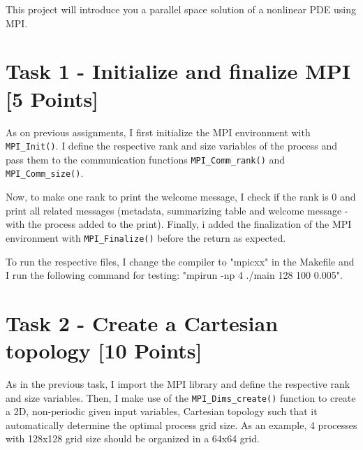 \documentclass[unicode,11pt,a4paper,oneside,numbers=endperiod,openany]{scrartcl}
\begin{document}
\setassignment

\newline

\assignmentpolicy
This project will introduce you a parallel space solution of a nonlinear PDE using MPI.


\section{Task 1 - Initialize and finalize MPI [5 Points]}

As on previous assignments, I first initialize the MPI environment with \texttt{MPI\_Init()}.
I define the respective rank and size variables of the process and pass them to
the communication functions \texttt{MPI\_Comm\_rank()} and \texttt{MPI\_Comm\_size()}.

Now, to make one rank to print the welcome message, I check if the rank is 0 and print all related messages
(metadata, summarizing table and welcome message - with the process added to the print). Finally, i added
the finalization of the MPI environment with \texttt{MPI\_Finalize()} before the return as expected.

To run the respective files, I change the compiler to "mpicxx" in the Makefile and I run the 
following command for testing: "mpirun -np 4 ./main 128 100 0.005".

\section{Task 2 - Create a Cartesian topology [10 Points]}

As in the previous task, I import the MPI library and define the respective rank and size variables.
Then, I make use of the \texttt{MPI\_Dims\_create()} function to create a 2D, non-periodic given input variables, 
Cartesian topology such that it automatically determine the optimal process grid size. As an example, 
4 processes with 128x128 grid size should be organized in a 64x64 grid. 
\end{document}
